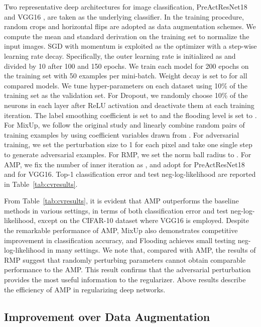 \documentclass[final]{cvpr}
\begin{document}
Two representative deep architectures for image classification, PreActResNet18 \cite{he2016identity} and VGG16 \cite{simonyan2015very}, are taken as the underlying classifier. In the training procedure, random crops and horizontal flips are adopted as data augmentation schemes. We compute the mean and standard derivation on the training set to normalize the input images. SGD with momentum is exploited as the optimizer with a step-wise learning rate decay. Specifically, the outer learning rate is initialized as  and divided by 10 after 100 and 150 epochs. We train each model for 200 epochs on the training set with 50 examples per mini-batch. Weight decay is set to  for all compared models. We tune hyper-parameters on each dataset using 10\% of the training set as the validation set. For Dropout, we randomly choose 10\% of the neurons in each layer after ReLU activation and deactivate them at each training iteration. The label smoothing coefficient is set to  and the flooding level is set to . For MixUp, we follow the original study \cite{zhang2018mixup} and linearly combine random pairs of training examples by using coefficient variables drawn from . For adversarial training, we set the perturbation size to 1 for each pixel and take one single step to generate adversarial examples. For RMP, we set the  norm ball radius to . For AMP, we fix the number of inner iteration as , and adopt  for PreActResNet18 and  for VGG16. Top-1 classification error and test neg-log-likelihood are reported in Table~\ref{tab:cvresults}.

From Table~\ref{tab:cvresults}, it is evident that AMP outperforms the baseline methods in various settings, in terms of both classification error and test neg-log-likelihood, except on the CIFAR-10 dataset where VGG16 is employed. Despite the remarkable performance of AMP, MixUp also demonstrates competitive improvement in classification accuracy, and Flooding achieves small testing neg-log-likelihood in many settings. We note that, compared with AMP, the results of RMP suggest that randomly perturbing parameters cannot obtain comparable performance to the AMP. This result confirms that the adversarial perturbation provides the most useful information to the regularizer. Above results describe the efficiency of AMP in regularizing deep networks.

\subsection{Improvement over Data Augmentation}\label{sec:augment}
\end{document}

